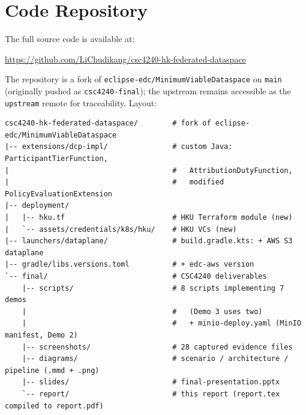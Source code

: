\documentclass[11pt,a4paper]{article}
\DeclareRobustCommand{\code}[1]{\texttt{\small #1}}
\begin{document}
\section{Code Repository}
\label{sec:repo}

The full source code is available at:

\begin{center}
\url{https://github.com/LiChudikang/csc4240-hk-federated-dataspace}
\end{center}

The repository is a fork of \code{eclipse-edc/MinimumViableDataspace}
on \code{main} (originally pushed as \code{csc4240-final}); the
upstream remains accessible as the \code{upstream} remote for
traceability. Layout:

\begin{lstlisting}
csc4240-hk-federated-dataspace/        # fork of eclipse-edc/MinimumViableDataspace
|-- extensions/dcp-impl/               # custom Java: ParticipantTierFunction,
|                                      #   AttributionDutyFunction,
|                                      #   modified PolicyEvaluationExtension
|-- deployment/
|   |-- hku.tf                         # HKU Terraform module (new)
|   `-- assets/credentials/k8s/hku/    # HKU VCs (new)
|-- launchers/dataplane/               # build.gradle.kts: + AWS S3 dataplane
|-- gradle/libs.versions.toml          # + edc-aws version
`-- final/                             # CSC4240 deliverables
    |-- scripts/                       # 8 scripts implementing 7 demos
    |                                  #   (Demo 3 uses two)
    |                                  #   + minio-deploy.yaml (MinIO manifest, Demo 2)
    |-- screenshots/                   # 28 captured evidence files
    |-- diagrams/                      # scenario / architecture / pipeline (.mmd + .png)
    |-- slides/                        # final-presentation.pptx
    `-- report/                        # this report (report.tex compiled to report.pdf)
\end{lstlisting}
\end{document}
